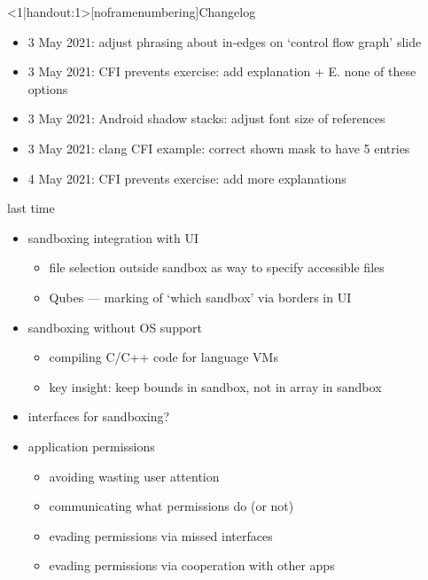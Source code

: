 \graphicspath{{./figures/}}
\title{}
\date{}

\begin{frame}
    \titlepage
\end{frame}


{
\begin{frame}<1|handout:1>[noframenumbering]{Changelog}
    \begin{itemize}
    \item 3 May 2021: adjust phrasing about in-edges on `control flow graph' slide
    \item 3 May 2021: CFI prevents exercise: add explanation + E. none of these options
    \item 3 May 2021: Android shadow stacks: adjust font size of references
    \item 3 May 2021: clang CFI example: correct shown mask to have 5 entries
    \item 4 May 2021: CFI prevents exercise: add more explanations
    \end{itemize}
\end{frame}
}



\begin{frame}{last time}
    \begin{itemize}
    \item sandboxing integration with UI
        \begin{itemize}
        \item file selection outside sandbox as way to specify accessible files
        \item Qubes --- marking of `which sandbox' via borders in UI
        \end{itemize}
    \item sandboxing without OS support
        \begin{itemize}
        \item compiling C/C++ code for language VMs
        \item key insight: keep bounds in sandbox, not in array in sandbox
        \end{itemize}
    \item interfaces for sandboxing?
    \item application permissions
        \begin{itemize}
        \item avoiding wasting user attention
        \item communicating what permissions do (or not)
        \item evading permissions via missed interfaces
        \item evading permissions via cooperation with other apps
        \end{itemize}
    \end{itemize}
\end{frame}

